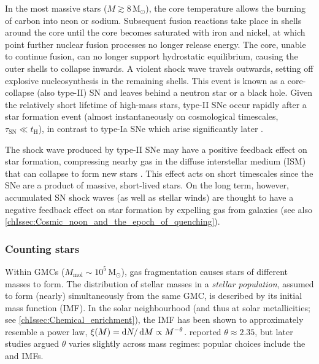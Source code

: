 In the most massive stars ($M \gtrsim 8 \, \mathrm{M_\odot}$), the core temperature allows the burning of carbon into neon or sodium. Subsequent fusion reactions take place in shells around the core until the core becomes saturated with iron and nickel, at which point further nuclear fusion processes no longer release energy. The core, unable to continue fusion, can no longer support hydrostatic equilibrium, causing the outer shells to collapse inwards. A violent shock wave travels outwards, setting off explosive nucleosynthesis in the remaining shells. This event is known as a core-collapse (also type-II) SN and leaves behind a neutron star or a black hole. Given the relatively short lifetime of high-mass stars, type-II SNe occur rapidly after a star formation event (almost instantaneously on cosmological timescales, $\tau_\text{SN} \ll t_\text{H}$), in contrast to type-Ia SNe which arise significantly later \citep{2016MNRAS.455.4183V}.

The shock wave produced by type-II SNe may have a positive feedback effect on star formation, compressing nearby gas in the diffuse interstellar medium (ISM) that can collapse to form new stars \citep[though it is unclear how effective this mechanism is;][]{2007ARA&A..45..565M}. This effect acts on short timescales since the SNe are a product of massive, short-lived stars. On the long term, however, accumulated SN shock waves (as well as stellar winds) are thought to have a negative feedback effect on star formation by expelling gas from galaxies (see also \cref{chIssec:Cosmic_noon_and_the_epoch_of_quenching}).

\subsubsection{Counting stars}
\label{chIsssec:Counting_stars}

Within GMCs ($M_\text{mol} \sim 10^{5} \, \mathrm{M_\odot}$), gas fragmentation causes stars of different masses to form. The distribution of stellar masses in a \textit{stellar population}, assumed to form (nearly) simultaneously from the same GMC, is described by its initial mass function (IMF). In the solar neighbourhood (and thus at solar metallicities; see \cref{chIssec:Chemical_enrichment}), the IMF has been shown to approximately resemble a power law, $\xi (M) = \dif N/\dif M \propto M^{-\theta}$. \citet{1955ApJ...121..161S} reported $\theta \approx 2.35$, but later studies argued $\theta$ varies slightly across mass regimes: popular choices include the \citet{2001MNRAS.322..231K} and \citet{2003PASP..115..763C} IMFs.

